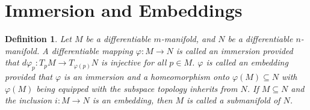 \documentclass[11pt]{book}
\theoremstyle{break}
\theoremstyle{break}
\newtheorem{defn}{Definition}[corL]
\begin{document}
\newpage
\section[Immersions and Embeddings]{\color{red}Immersion and Embeddings\color{black}}
\begin{defn}
Let $M$ be a differentiable $m$-manifold, and $N$ be a differentiable $n$-manifold. A differentiable mapping $\varphi: M \to N$ is called an immersion provided that $d\varphi_p: T_pM  \to T_{\varphi(p)}N$ is injective for all $p \in M$. $\varphi$ is called an embedding provided that $\varphi$ is an immersion and a homeomorphism onto $\varphi(M) \subseteq N$ with $\varphi(M)$ being equipped with the subspace topology inherits from $N$. If $M \subseteq N$ and the inclusion $i:M \to N$ is an embedding, then $M$ is called a submanifold of $N$.
\end{defn}
\end{document}
